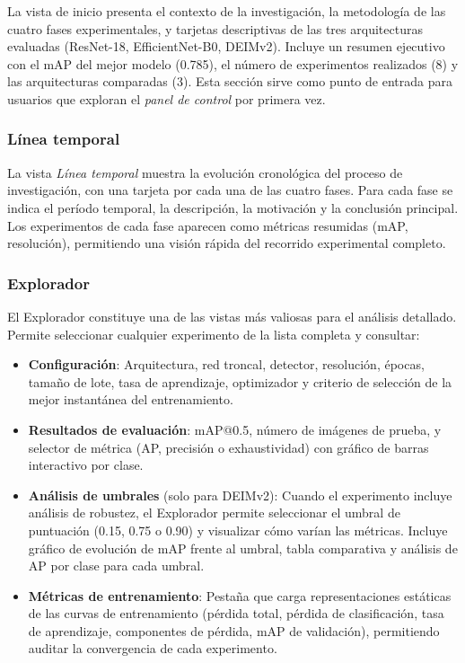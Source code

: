 La vista de inicio presenta el contexto de la investigación, la metodología de las cuatro fases experimentales, y tarjetas descriptivas de las tres arquitecturas evaluadas (ResNet-18, EfficientNet-B0, DEIMv2). Incluye un resumen ejecutivo con el mAP del mejor modelo (0.785), el número de experimentos realizados (8) y las arquitecturas comparadas (3). Esta sección sirve como punto de entrada para usuarios que exploran el \textit{panel de control} por primera vez.

\subsubsection{Línea temporal}

La vista \textit{Línea temporal} muestra la evolución cronológica del proceso de investigación, con una tarjeta por cada una de las cuatro fases. Para cada fase se indica el período temporal, la descripción, la motivación y la conclusión principal. Los experimentos de cada fase aparecen como métricas resumidas (mAP, resolución), permitiendo una visión rápida del recorrido experimental completo.

\subsubsection{Explorador}

El Explorador constituye una de las vistas más valiosas para el análisis detallado. Permite seleccionar cualquier experimento de la lista completa y consultar:

\begin{itemize}
    \item \textbf{Configuración}: Arquitectura, red troncal, detector, resolución, épocas, tamaño de lote, tasa de aprendizaje, optimizador y criterio de selección de la mejor instantánea del entrenamiento.
    \item \textbf{Resultados de evaluación}: mAP@0.5, número de imágenes de prueba, y selector de métrica (AP, precisión o exhaustividad) con gráfico de barras interactivo por clase.
    \item \textbf{Análisis de umbrales} (solo para DEIMv2): Cuando el experimento incluye análisis de robustez, el Explorador permite seleccionar el umbral de puntuación (0.15, 0.75 o 0.90) y visualizar cómo varían las métricas. Incluye gráfico de evolución de mAP frente al umbral, tabla comparativa y análisis de AP por clase para cada umbral.
    \item \textbf{Métricas de entrenamiento}: Pestaña que carga representaciones estáticas de las curvas de entrenamiento (pérdida total, pérdida de clasificación, tasa de aprendizaje, componentes de pérdida, mAP de validación), permitiendo auditar la convergencia de cada experimento.
\end{itemize}

